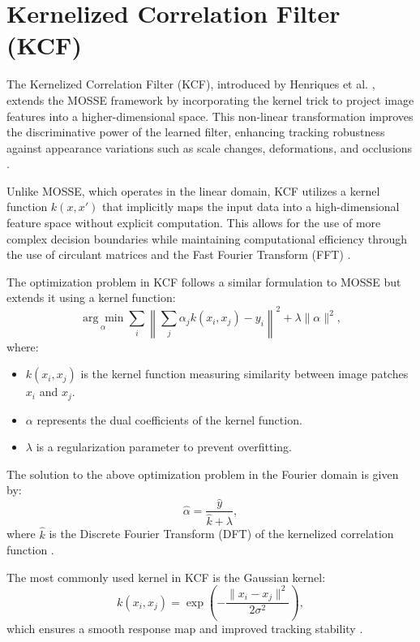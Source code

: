
\section{Kernelized Correlation Filter (KCF)}
The Kernelized Correlation Filter (KCF), introduced by Henriques et al. \cite{henriques2014high}, extends the MOSSE framework by incorporating the kernel trick to project image features into a higher-dimensional space. This non-linear transformation improves the discriminative power of the learned filter, enhancing tracking robustness against appearance variations such as scale changes, deformations, and occlusions \cite{henriques2012exploiting}.

Unlike MOSSE, which operates in the linear domain, KCF utilizes a kernel function $k(x, x')$ that implicitly maps the input data into a high-dimensional feature space without explicit computation. This allows for the use of more complex decision boundaries while maintaining computational efficiency through the use of circulant matrices and the Fast Fourier Transform (FFT) \cite{henriques2014high}.

The optimization problem in KCF follows a similar formulation to MOSSE but extends it using a kernel function:
\begin{equation}
    \underset{\alpha}{\arg\min} \sum_{i} \left\| \sum_{j} \alpha_j k(x_i, x_j) - y_i \right\|^2 + \lambda \|\alpha\|^2,
\end{equation}
where:
\begin{itemize}
    \item $k(x_i, x_j)$ is the kernel function measuring similarity between image patches $x_i$ and $x_j$.
    \item $\alpha$ represents the dual coefficients of the kernel function.
    \item $\lambda$ is a regularization parameter to prevent overfitting.
\end{itemize}

The solution to the above optimization problem in the Fourier domain is given by:
\begin{equation}
    \hat{\alpha} = \frac{\hat{y}}{\hat{k} + \lambda},
\end{equation}
where $\hat{k}$ is the Discrete Fourier Transform (DFT) of the kernelized correlation function \cite{henriques2014high}.

The most commonly used kernel in KCF is the Gaussian kernel:
\begin{equation}
    k(x_i, x_j) = \exp\left(-\frac{\|x_i - x_j\|^2}{2\sigma^2} \right),
\end{equation}
which ensures a smooth response map and improved tracking stability \cite{henriques2012exploiting}.

